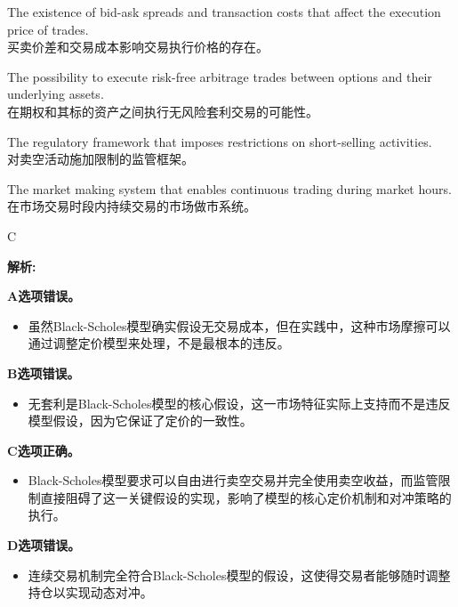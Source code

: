 \documentclass{article}
\newenvironment{explanation}
{\textbf{解析:}\par}
{\par}
\begin{document}
    \begin{choices}
    \item The existence of bid-ask spreads and transaction costs that affect the execution price of trades.\\
    买卖价差和交易成本影响交易执行价格的存在。
    \item The possibility to execute risk-free arbitrage trades between options and their underlying assets.\\
    在期权和其标的资产之间执行无风险套利交易的可能性。
    \item The regulatory framework that imposes restrictions on short-selling activities.\\
    对卖空活动施加限制的监管框架。
    \item The market making system that enables continuous trading during market hours.\\
    在市场交易时段内持续交易的市场做市系统。
    \end{choices}
    
    \begin{correctanswer}
    C
    \end{correctanswer}
    
    \begin{explanation}
    \textbf{A选项错误。}
    \begin{itemize}
        \item 虽然Black-Scholes模型确实假设无交易成本，但在实践中，这种市场摩擦可以通过调整定价模型来处理，不是最根本的违反。
    \end{itemize}
    
    \textbf{B选项错误。}
    \begin{itemize}
        \item 无套利是Black-Scholes模型的核心假设，这一市场特征实际上支持而不是违反模型假设，因为它保证了定价的一致性。
    \end{itemize}
    
    \textbf{C选项正确。}
    \begin{itemize}
        \item Black-Scholes模型要求可以自由进行卖空交易并完全使用卖空收益，而监管限制直接阻碍了这一关键假设的实现，影响了模型的核心定价机制和对冲策略的执行。
    \end{itemize}
    
    \textbf{D选项错误。}
    \begin{itemize}
        \item 连续交易机制完全符合Black-Scholes模型的假设，这使得交易者能够随时调整持仓以实现动态对冲。
    \end{itemize}
    \end{explanation}
    
\end{document}
